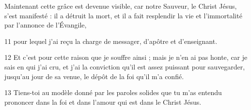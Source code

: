 
Maintenant cette grâce est devenue visible, car notre Sauveur, le Christ Jésus, s’est manifesté : il a détruit la mort, et il a fait resplendir la vie et l’immortalité par l’annonce de l’Évangile,

11 pour lequel j’ai reçu la charge de messager, d’apôtre et d’enseignant.

12 Et c’est pour cette raison que je souffre ainsi ; mais je n’en ai pas honte, car je sais en qui j’ai cru, et j’ai la conviction qu’il est assez puissant pour sauvegarder, jusqu’au jour de sa venue, le dépôt de la foi qu’il m’a confié.

13 Tiens-toi au modèle donné par les paroles solides que tu m’as entendu prononcer dans la foi et dans l’amour qui est dans le Christ Jésus.